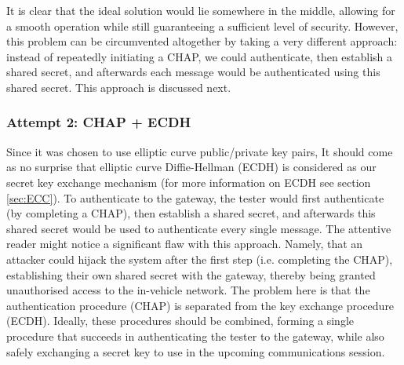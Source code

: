 \documentclass[master=cws,masteroption=vs,english]{kulemt}
\begin{document}
It is clear that the ideal solution would lie somewhere in the middle, allowing for a smooth operation while still guaranteeing a sufficient level of security. However, this problem can be circumvented altogether by taking a very different approach: instead of repeatedly initiating a CHAP, we could authenticate, then establish a shared secret, and afterwards each message would be authenticated using this shared secret. This approach is discussed next.

\subsubsection{Attempt 2: CHAP + ECDH}
Since it was chosen to use elliptic curve public/private key pairs, It should come as no surprise that elliptic curve Diffie-Hellman (ECDH) is considered as our secret key exchange mechanism (for more information on ECDH see section \ref{sec:ECC}). To authenticate to the gateway, the tester would first authenticate (by completing a CHAP), then establish a shared secret, and afterwards this shared secret would be used to authenticate every single message. The attentive reader might notice a significant flaw with this approach. Namely, that an attacker could hijack the system after the first step (i.e. completing the CHAP), establishing their own shared secret with the gateway, thereby being granted unauthorised access to the in-vehicle network. The problem here is that the authentication procedure (CHAP) is separated from the key exchange procedure (ECDH). Ideally, these procedures should be combined, forming a single procedure that succeeds in authenticating the tester to the gateway, while also safely exchanging a secret key to use in the upcoming communications session. 
\end{document}

